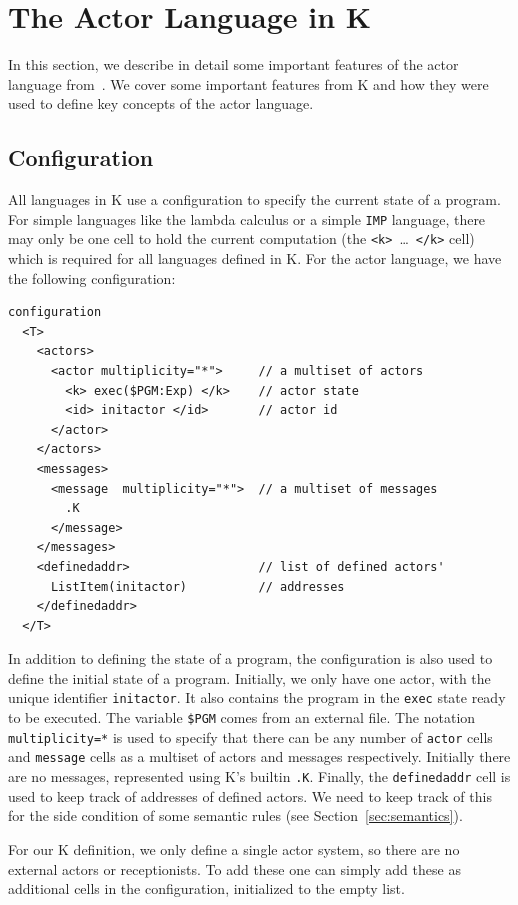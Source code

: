 \documentclass{llncs}
\begin{document}
\section{The Actor Language in K}
In this section, we describe in detail some important features of the actor
language from~\cite{actor}. We cover some important features from K and how 
they were
used to define key concepts of the actor language.

\subsection{Configuration}\label{sec:configuration}
All languages in K use a configuration to specify the current state of a
program. For simple languages like the lambda calculus or a simple \texttt{IMP}
language, there may only be one cell to hold the current computation (the
\texttt{<k>}\ \dots\ \texttt{</k>} cell) which is required for all languages
defined in K. For the actor language, we have the following configuration:
\begin{verbatim}
configuration 
  <T>
    <actors>
      <actor multiplicity="*">     // a multiset of actors
        <k> exec($PGM:Exp) </k>    // actor state
        <id> initactor </id>       // actor id
      </actor>
    </actors>
    <messages>
      <message  multiplicity="*">  // a multiset of messages
        .K
      </message>
    </messages>
    <definedaddr>                  // list of defined actors'
      ListItem(initactor)          // addresses
    </definedaddr>
  </T>
\end{verbatim}
In addition to defining the state of a program, the configuration is also used
to define the initial state of a program. Initially, we only have one actor,
with the unique identifier \texttt{initactor}. It also contains the program in
the \texttt{exec} state ready to be executed. The variable \texttt{\$PGM} comes
from an external file. The notation \texttt{multiplicity=*} is used to specify
that there can be any number of \texttt{actor} cells and \texttt{message} cells
as a multiset of actors and messages respectively. Initially there are no
messages, represented using K's builtin \texttt{.K}. Finally, the
\texttt{definedaddr} cell is used to keep track of addresses of defined
actors. We need to keep track of this for the side condition of some semantic
rules (see Section~\ref{sec:semantics}).

For our K definition, we only define a single actor system, so there are no
external actors or receptionists. To add these one can simply add these as
additional cells in the configuration, initialized to the empty list.
\end{document}
